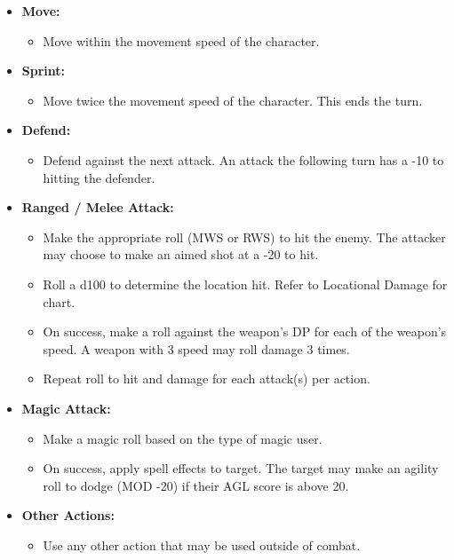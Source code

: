 \documentclass[12pt,]{article}
\providecommand{\tightlist}{%
  \setlength{\itemsep}{0pt}\setlength{\parskip}{0pt}}
\begin{document}
\begin{itemize}
\tightlist
\item
  \textbf{Move:}

  \begin{itemize}
  \tightlist
  \item
    Move within the movement speed of the character.
  \end{itemize}
\item
  \textbf{Sprint:}

  \begin{itemize}
  \tightlist
  \item
    Move twice the movement speed of the character. This ends the turn.
  \end{itemize}
\item
  \textbf{Defend:}

  \begin{itemize}
  \tightlist
  \item
    Defend against the next attack. An attack the following turn has a
    -10 to hitting the defender.
  \end{itemize}
\item
  \textbf{Ranged / Melee Attack:}

  \begin{itemize}
  \tightlist
  \item
    Make the appropriate roll (MWS or RWS) to hit the enemy. The
    attacker may choose to make an aimed shot at a -20 to hit.
  \item
    Roll a d100 to determine the location hit. Refer to Locational
    Damage for chart.
  \item
    On success, make a roll against the weapon's DP for each of the
    weapon's speed. A weapon with 3 speed may roll damage 3 times.
  \item
    Repeat roll to hit and damage for each attack(s) per action.
  \end{itemize}
\item
  \textbf{Magic Attack:}

  \begin{itemize}
  \tightlist
  \item
    Make a magic roll based on the type of magic user.
  \item
    On success, apply spell effects to target. The target may make an
    agility roll to dodge (MOD -20) if their AGL score is above 20.
  \end{itemize}
\item
  \textbf{Other Actions:}

  \begin{itemize}
  \tightlist
  \item
    Use any other action that may be used outside of combat.
  \end{itemize}
\end{itemize}
\end{document}
